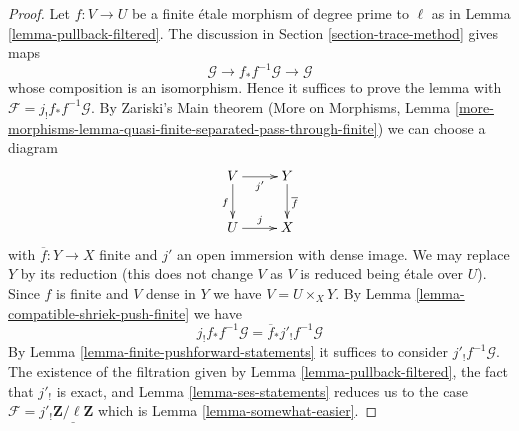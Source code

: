 \documentclass[10pt,a4paper]{amsart}
\theoremstyle{plain}
\theoremstyle{definition}
\theoremstyle{remark}
\numberwithin{equation}{subsection}
\begin{document}
\begin{proof}
Let $f : V \to U$ be a finite \'etale morphism of degree prime to $\ell$
as in Lemma \ref{lemma-pullback-filtered}. The discussion in
Section \ref{section-trace-method} gives maps
$$
\mathcal{G} \to f_*f^{-1}\mathcal{G} \to \mathcal{G}
$$
whose composition is an isomorphism. Hence it suffices to prove the
lemma with $\mathcal{F} = j_!f_*f^{-1}\mathcal{G}$.
By Zariski's Main theorem
(More on Morphisms, Lemma
\ref{more-morphisms-lemma-quasi-finite-separated-pass-through-finite})
we can choose a diagram
$$
\xymatrix{
V \ar[r]_{j'} \ar[d]_f & Y \ar[d]^{\overline{f}} \\
U \ar[r]^j & X
}
$$
with $\overline{f} : Y \to X$ finite and $j'$ an open immersion
with dense image. We may replace $Y$ by its reduction (this does
not change $V$ as $V$ is reduced being \'etale over $U$).
Since $f$ is finite and $V$ dense in $Y$ we have $V = U \times_X Y$. By
Lemma \ref{lemma-compatible-shriek-push-finite} we have
$$
j_!f_*f^{-1}\mathcal{G} = \overline{f}_*j'_!f^{-1}\mathcal{G}
$$
By Lemma \ref{lemma-finite-pushforward-statements} it suffices to
consider $j'_!f^{-1}\mathcal{G}$.
The existence of the filtration given by
Lemma \ref{lemma-pullback-filtered},
the fact that $j'_!$ is exact, and
Lemma \ref{lemma-ses-statements}
reduces us to the case
$\mathcal{F} = j'_!\underline{\mathbf{Z}/\ell\mathbf{Z}}$
which is Lemma \ref{lemma-somewhat-easier}.
\end{proof}
\end{document}
